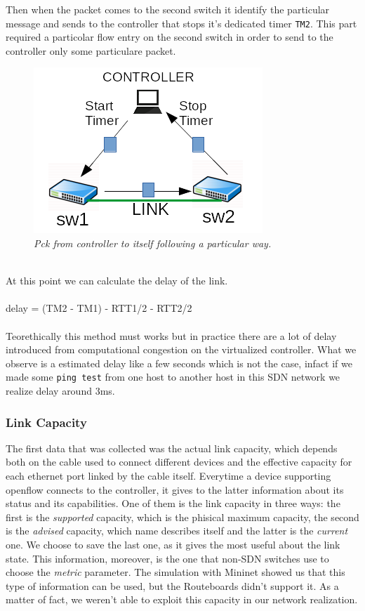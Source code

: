 \documentclass[article,10pt]{IEEEtran}
\begin{document}
Then when the packet comes to the second switch it identify the particular message and sends to the controller that stops it's dedicated timer \texttt{TM2}.
\newline This part required a particolar flow entry on the second switch in order to send to the controller only some particulare packet.
\begin{figure}[!h]
 \centering
 \includegraphics[scale=0.70]{images/rtt1.png}
 \caption{\emph{Pck from controller to itself following a particular way.}}
 \label{fig:topo}
\end{figure}
\\
\newline At this point we can calculate the delay of the link.
\\
\\
 delay = (TM2 - TM1) - RTT1/2 - RTT2/2
\\
\\
Teorethically this method must works but in practice there are a lot of delay introduced from computational congestion on the virtualized controller.
What we observe is a estimated delay like a few seconds which is not the case, infact if we made some \texttt{ping test} from one host to another host
in this SDN network we realize delay around 3ms.
\\

		\subsubsection{Link Capacity}

	The first data that was collected was the actual link capacity, which depends both on the cable used to connect
	different devices and the effective capacity for each ethernet port linked by the cable itself. Everytime a device supporting
	openflow connects to the controller, it gives to the latter information about its status and its capabilities. One of them is
	the link capacity in three ways: the first is the \textit{supported} capacity, which is the phisical maximum capacity, the second is the
	\textit{advised} capacity, which name describes itself and the latter is the \textit{current} one. We choose to save the last one,
	as it gives the most useful about the link state. This information, moreover, is the one that non-SDN switches use to choose the \textit{metric}
	parameter. The simulation with Mininet showed us that this type of information can be used, but the Routeboards didn't support it.
	As a matter of fact, we weren't able to exploit this capacity in our network realization.
		\\
		\\
\end{document}
